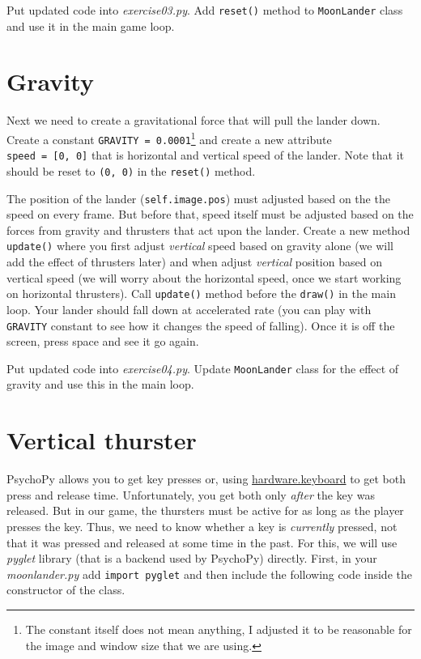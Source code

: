 \documentclass[
]{book}
\begin{document}
Put updated code into \emph{exercise03.py}. Add \texttt{reset()} method to \texttt{MoonLander} class and use it in the main game loop.

\hypertarget{gravity}{%
\section{Gravity}\label{gravity}}

Next we need to create a gravitational force that will pull the lander down. Create a constant \texttt{GRAVITY\ =\ 0.0001}\footnote{The constant itself does not mean anything, I adjusted it to be reasonable for the image and window size that we are using.} and create a new attribute \texttt{speed\ =\ {[}0,\ 0{]}} that is horizontal and vertical speed of the lander. Note that it should be reset to \texttt{(0,\ 0)} in the \texttt{reset()} method.

The position of the lander (\texttt{self.image.pos}) must adjusted based on the the speed on every frame. But before that, speed itself must be adjusted based on the forces from gravity and thrusters that act upon the lander. Create a new method \texttt{update()} where you first adjust \emph{vertical} speed based on gravity alone (we will add the effect of thrusters later) and when adjust \emph{vertical} position based on vertical speed (we will worry about the horizontal speed, once we start working on horizontal thrusters). Call \texttt{update()} method before the \texttt{draw()} in the main loop. Your lander should fall down at accelerated rate (you can play with \texttt{GRAVITY} constant to see how it changes the speed of falling). Once it is off the screen, press space and see it go again.

Put updated code into \emph{exercise04.py}. Update \texttt{MoonLander} class for the effect of gravity and use this in the main loop.

\hypertarget{vertical-thurster}{%
\section{Vertical thurster}\label{vertical-thurster}}

PsychoPy allows you to get key presses or, using \href{https://www.psychopy.org/api/hardware/keyboard.html}{hardware.keyboard} to get both press and release time. Unfortunately, you get both only \emph{after} the key was released. But in our game, the thursters must be active for as long as the player presses the key. Thus, we need to know whether a key is \emph{currently} pressed, not that it was pressed and released at some time in the past. For this, we will use \emph{pyglet} library (that is a backend used by PsychoPy) directly. First, in your \emph{moonlander.py} add \texttt{import\ pyglet} and then include the following code inside the constructor of the class.
\end{document}
